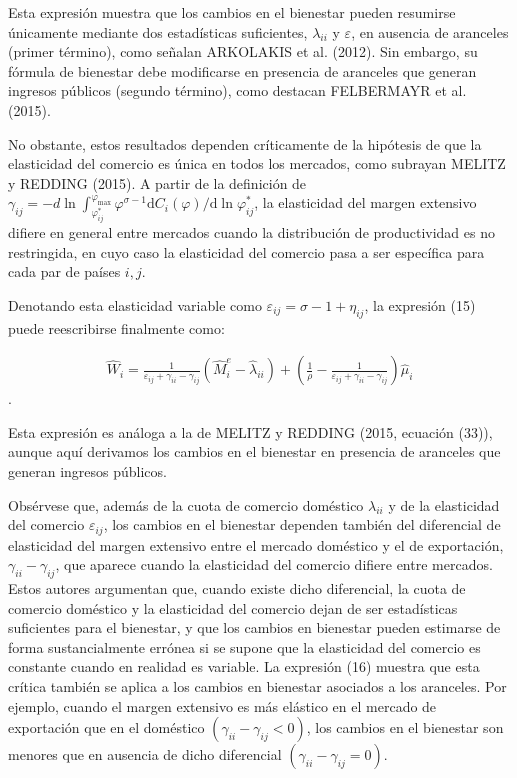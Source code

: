 \documentclass[10pt,a4paper]{article}
\begin{document}
Esta expresión muestra que los cambios en el bienestar pueden resumirse únicamente mediante dos estadísticas suficientes, $\lambda_{ii}$ y $\varepsilon$, en ausencia de aranceles (primer término), como señalan ARKOLAKIS et al. (2012). Sin embargo, su fórmula de bienestar debe modificarse en presencia de aranceles que generan ingresos públicos (segundo término), como destacan FELBERMAYR et al. (2015).

No obstante, estos resultados dependen críticamente de la hipótesis de que la elasticidad del comercio es única en todos los mercados, como subrayan  MELITZ y REDDING (2015). A partir de la definición de $\gamma_{ij} = - d\ln \int_{\varphi_{ij}^*}^{\varphi_{\max}} \varphi^{\sigma-1} \mathrm dC_i(\varphi) / \mathrm d\ln \varphi_{ij}^*$, la elasticidad del margen extensivo difiere en general entre mercados cuando la distribución de productividad es no restringida, en cuyo caso la elasticidad del comercio pasa a ser específica para cada par de países $i,j$. 

Denotando esta elasticidad variable como $\varepsilon_{ij} = \sigma - 1 + \eta_{ij}$, la expresión (15) puede reescribirse finalmente como:

$$\begin{aligned}
    \hat{W}_i =\frac{1}{\varepsilon_{ij} + \gamma_{ii} - \gamma_{ij}}\left(\hat{M}_i^e - \hat{\lambda}_{ii}\right)+\left(\frac{1}{\rho} -\frac{1}{\varepsilon_{ij} + \gamma_{ii} - \gamma_{ij}}\right)\hat{\mu}_i
\end{aligned}$$.

Esta expresión es análoga a la de MELITZ y REDDING (2015, ecuación (33)), aunque aquí derivamos los cambios en el bienestar en presencia de aranceles que generan ingresos públicos. 

Obsérvese que, además de la cuota de comercio doméstico $\lambda_{ii}$ y de la elasticidad del comercio $\varepsilon_{ij}$, los cambios en el bienestar dependen también del diferencial de elasticidad del margen extensivo entre el mercado doméstico y el de exportación, $\gamma_{ii} - \gamma_{ij}$, que aparece cuando la elasticidad del comercio difiere entre mercados. Estos autores argumentan que, cuando existe dicho diferencial, la cuota de comercio doméstico y la elasticidad del comercio dejan de ser estadísticas suficientes para el bienestar, y que los cambios en bienestar pueden estimarse de forma sustancialmente errónea si se supone que la elasticidad del comercio es constante cuando en realidad es variable. La expresión (16) muestra que esta crítica también se aplica a los cambios en bienestar asociados a los aranceles. Por ejemplo, cuando el margen extensivo es más elástico en el mercado de exportación que en el doméstico $(\gamma_{ii} - \gamma_{ij} < 0)$, los cambios en el bienestar son menores que en ausencia de dicho diferencial $(\gamma_{ii} - \gamma_{ij} = 0)$.
\end{document}
